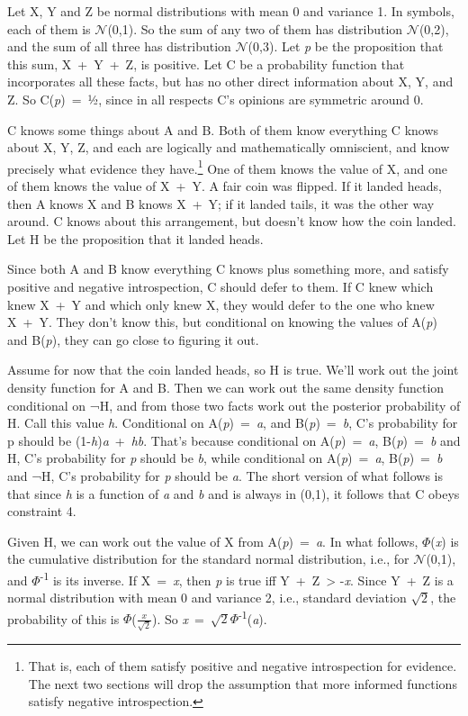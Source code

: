 \documentclass[
  10pt,
  letterpaper,
  DIV=11,
  numbers=noendperiod,
  twoside]{scrartcl}
\begin{document}
Let X, Y and Z be normal distributions with mean 0 and variance 1. In
symbols, each of them is \(\mathcal{N}\)(0,1). So the sum of any two of
them has distribution \(\mathcal{N}\)(0,2), and the sum of all three has
distribution \(\mathcal{N}\)(0,3). Let \emph{p} be the proposition that
this sum, X~+~Y~+~Z, is positive. Let C be a probability function that
incorporates all these facts, but has no other direct information about
X, Y, and Z. So C(\emph{p})~=~½, since in all respects C's opinions are
symmetric around 0.

C knows some things about A and B. Both of them know everything C knows
about X, Y, Z, and each are logically and mathematically omniscient, and
know precisely what evidence they have.\footnote{That is, each of them
  satisfy positive and negative introspection for evidence. The next two
  sections will drop the assumption that more informed functions satisfy
  negative introspection.} One of them knows the value of X, and one of
them knows the value of X~+~Y. A fair coin was flipped. If it landed
heads, then A knows X and B knows X~+~Y; if it landed tails, it was the
other way around. C knows about this arrangement, but doesn't know how
the coin landed. Let H be the proposition that it landed heads.

Since both A and B know everything C knows plus something more, and
satisfy positive and negative introspection, C should defer to them. If
C knew which knew X~+~Y and which only knew X, they would defer to the
one who knew X~+~Y. They don't know this, but conditional on knowing the
values of A(\emph{p}) and B(\emph{p}), they can go close to figuring it
out.

Assume for now that the coin landed heads, so H is true. We'll work out
the joint density function for A and B. Then we can work out the same
density function conditional on ¬H, and from those two facts work out
the posterior probability of H. Call this value \emph{h}. Conditional on
A(\emph{p})~=~\emph{a}, and B(\emph{p})~=~\emph{b}, C's probability for
p should be (1-\emph{h})\emph{a}~+~\emph{hb}. That's because conditional
on A(\emph{p})~=~\emph{a}, B(\emph{p})~=~\emph{b} and H, C's probability
for \emph{p} should be \emph{b}, while conditional on
A(\emph{p})~=~\emph{a}, B(\emph{p})~=~\emph{b} and ¬H, C's probability
for \emph{p} should be \emph{a}. The short version of what follows is
that since \emph{h} is a function of \emph{a} and \emph{b} and is always
in (0,1), it follows that C obeys constraint 4.

Given H, we can work out the value of X from A(\emph{p})~=~\emph{a}. In
what follows, \(\Phi\)(\emph{x}) is the cumulative distribution for the
standard normal distribution, i.e., for \(\mathcal{N}\)(0,1), and
\(\Phi\)\textsuperscript{-1} is its inverse. If X~=~\emph{x}, then
\emph{p} is true iff Y~+~Z~\textgreater{} -\emph{x}. Since Y~+~Z is a
normal distribution with mean 0 and variance 2, i.e., standard deviation
\(\sqrt{2}\), the probability of this is
\(\Phi\)(\(\frac{x}{\sqrt{2}}\)). So
\emph{x}~=~\(\sqrt{2}\Phi\)\textsuperscript{-1}(\emph{a}).
\end{document}

